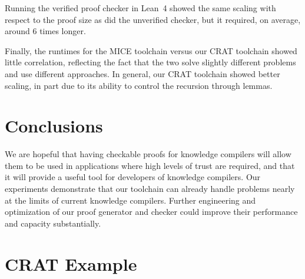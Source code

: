 \documentclass[letterpaper,USenglish,cleveref, autoref, thm-restate]{lipics-v2021}
\newcommand{\pand}{\mathbin{\land^{\sf p}}}
\newcommand{\dependencyset}{{\cal D}}
\newcommand{\modelset}{{\cal M}}
\newcommand{\makenode}[1]{\mathbf{#1}}
\newcommand{\nodeu}{\makenode{u}}
\newcommand{\lean}{Lean~4}
\begin{document}
Running the verified proof checker in \lean{} showed the same scaling
with respect to the proof size as did the unverified checker, but it
required, on average, around 6 times longer.

Finally, the runtimes for the MICE toolchain versus our CRAT toolchain
showed little correlation, reflecting the fact that the two solve
slightly different problems and use different approaches.  In general,
our CRAT toolchain showed better scaling, in part due to its ability
to control the recursion through lemmas.

\section{Conclusions}
\label{sect:future}

We are hopeful that having checkable proofs for knowledge compilers
will allow them to be used in applications where high levels of trust
are required, and that it will provide a useful tool for developers of
knowledge compilers.
Our experiments demonstrate that our toolchain can already
 handle problems nearly at the limits of current knowledge compilers.
Further engineering and optimization of our proof
generator and checker could improve their performance and capacity substantially.








\newpage

\appendix

\section{CRAT Example}
\label{app:crat:example}
\end{document}
